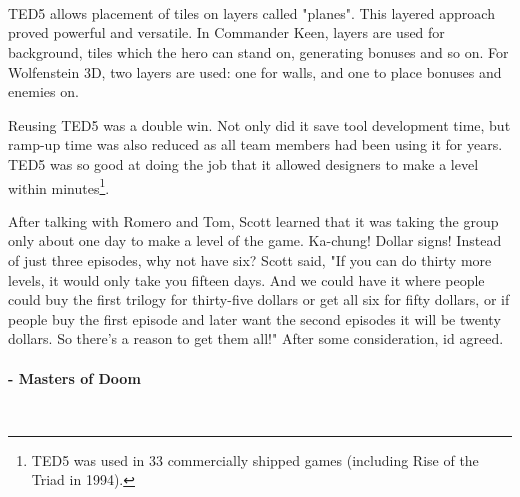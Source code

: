 \documentclass[book.tex]{subfiles}
\begin{document}
 
 \par
 \\
 \par
{}\\
 


 \\
\par
\vspace{20pt}
\par


 \par
 TED5 allows placement of tiles on layers called "planes". This layered approach proved powerful and versatile. In Commander Keen, layers are used for background, tiles which the hero can stand on, generating bonuses and so on. For Wolfenstein 3D, two layers are used: one for walls, and one to place bonuses and enemies on.\\
 \par

Reusing TED5 was a double win. Not only did it save tool development time, but ramp-up time was also reduced as all team members had been using it for years. TED5 was so good at doing the job that it allowed designers to make a level within minutes\footnote{TED5 was used in 33 commercially shipped games (including Rise of the Triad in 1994).}.\\
\par

 \begin{fancyquotes}
After talking with Romero and Tom, Scott learned that it was taking the group only about one day to make a level of the game. Ka-chung! Dollar signs! Instead of just three episodes, why not have six? Scott said, "If you can do thirty more levels, it would only take you fifteen days. And we could have it where people could buy the first trilogy for thirty-five dollars or get all six for fifty dollars, or if people buy the first episode and later want the second episodes it will be twenty dollars. So there's a reason to get them all!" After some consideration, id agreed.\\
\\
 \textbf{- Masters of Doom}
 \end{fancyquotes}\\
\end{document}
